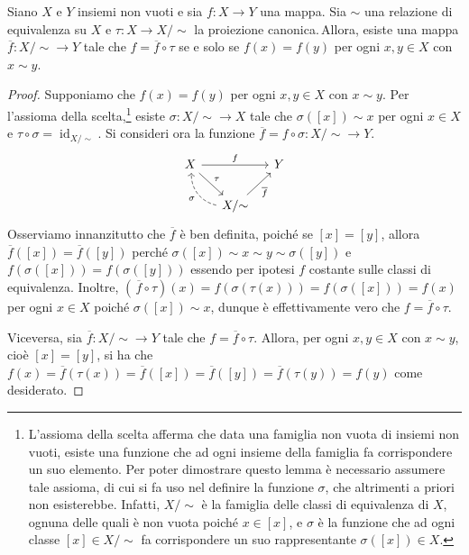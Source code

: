 \begin{lem}{}
Siano $X$ e $Y$ insiemi non vuoti e sia $f\colon X\to Y$ una mappa. Sia $\sim$ una relazione di equivalenza su $X$ e $\tau\colon X\to X/{\sim}$ la proiezione canonica.\footnotemark\,Allora, esiste una mappa $\overline{f}\colon X/{\sim}\to Y$ tale che $f=\overline{f}\circ \tau$ se e solo se $f(x)=f(y)$ per ogni $x,y\in X$ con $x\sim y$.
\end{lem}
\vspace{-4mm}
\begin{proof}
Supponiamo che $f(x)=f(y)$ per ogni $x,y\in X$ con $x\sim y$. Per l'assioma della scelta,\footnote{L'assioma della scelta afferma che data una famiglia non vuota di insiemi non vuoti, esiste una funzione che ad ogni insieme della famiglia fa corrispondere un suo elemento. Per poter dimostrare questo lemma è necessario assumere tale assioma, di cui si fa uso nel definire la funzione $\sigma$, che altrimenti a priori non esisterebbe. Infatti, $X/{\sim}$ è la famiglia delle classi di equivalenza di $X$, ognuna delle quali è non vuota poiché $x\in [x]$, e $\sigma$ è la funzione che ad ogni classe $[x]\in X/{\sim}$ fa corrispondere un suo rappresentante $\sigma([x])\in X$.} esiste $\sigma\colon X/{\sim}\to X$ tale che $\sigma([x])\sim x$ per ogni $x\in X$ e $\tau \circ \sigma = \operatorname{id}_{X/{\sim}}$. Si consideri ora la funzione $\overline{f}=f\circ \sigma \colon X/{\sim}\to Y$.
\[
	\begin{tikzcd}[column sep=small]
X \arrow[rd, "\tau"] \arrow[rr, "f"] &                                                                               & Y \\
                                     & X/{\sim} \arrow[ru, "\overline{f}"'] \arrow[lu, "\sigma", dashed, bend left=40] &  
\end{tikzcd}
\]
Osserviamo innanzitutto che $\overline{f}$ è ben definita, poiché se $[x]=[y]$, allora $\overline{f}([x])=\overline{f}([y])$ perché $\sigma([x])\sim x\sim y\sim \sigma([y])$ e $f(\sigma([x]))=f(\sigma([y]))$ essendo per ipotesi $f$ costante sulle classi di equivalenza. Inoltre, $\left(\,\overline{f}\circ \tau\right) (x)=f(\sigma(\tau(x)))=f(\sigma([x]))=f(x)$ per ogni $x\in X$ poiché $\sigma([x])\sim x$, dunque è effettivamente vero che $f=\overline{f}\circ \tau$.

Viceversa, sia $\overline{f}\colon X/{\sim}\to Y$ tale che $f=\overline{f}\circ \tau$. Allora, per ogni $x,y \in X$ con $x\sim y$, cioè $[x]=[y]$, si ha che $f(x)=\overline{f}(\tau(x))=\overline{f}([x])=\overline{f}([y])=\overline{f}(\tau(y))=f(y)$ come desiderato.
\end{proof}

